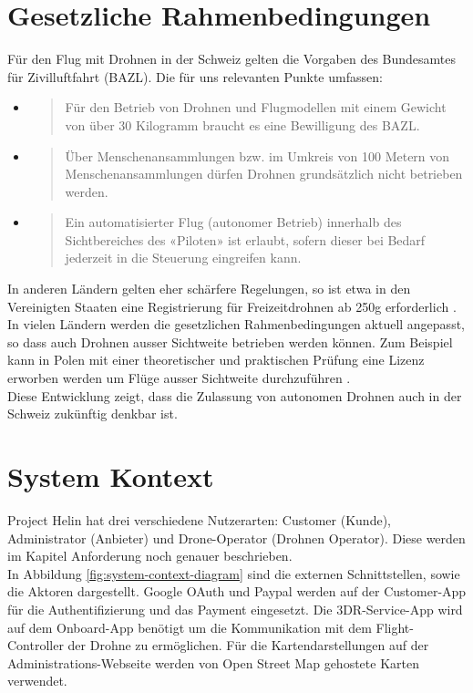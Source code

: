 \section{Gesetzliche Rahmenbedingungen}
Für den Flug mit Drohnen in der Schweiz gelten die Vorgaben des Bundesamtes für Zivilluftfahrt (BAZL). Die für uns relevanten Punkte umfassen:
\begin{itemize}
	\item{\blockquote{Für den Betrieb von Drohnen und Flugmodellen mit einem Gewicht von über 30 Kilogramm braucht es eine Bewilligung des BAZL.} \cite{drohne-bazl}}
	\item{\blockquote{Über Menschenansammlungen bzw. im Umkreis von 100 Metern von Menschenansammlungen dürfen Drohnen grundsätzlich nicht betrieben werden.} \cite{drohne-bazl}}
	\item{\blockquote{Ein automatisierter Flug (autonomer Betrieb) innerhalb des Sichtbereiches des «Piloten» ist erlaubt, sofern dieser bei Bedarf jederzeit in die Steuerung eingreifen kann.}
	\cite{drohne-bazl}}
\end{itemize}
In anderen Ländern gelten eher schärfere Regelungen, so ist etwa in den Vereinigten Staaten eine Registrierung für Freizeitdrohnen ab 250g erforderlich \cite[Seite 26]{pwc-drone}. In vielen Ländern werden die gesetzlichen Rahmenbedingungen aktuell angepasst, so dass auch Drohnen ausser Sichtweite betrieben werden können. Zum Beispiel kann in Polen mit einer theoretischer und praktischen Prüfung eine Lizenz erworben werden um Flüge ausser Sichtweite durchzuführen \cite[Seite 21]{pwc-drone}.\\

Diese Entwicklung zeigt, dass die Zulassung von autonomen Drohnen auch in der Schweiz zukünftig denkbar ist. 

\section{System Kontext}

Project Helin hat drei verschiedene Nutzerarten: Customer (Kunde), Administrator (Anbieter) und Drone-Operator (Drohnen Operator). Diese werden im Kapitel Anforderung noch genauer beschrieben.\\

In Abbildung \ref{fig:system-context-diagram} sind die externen Schnittstellen, sowie die Aktoren dargestellt. Google OAuth und Paypal werden auf der Customer-App für die Authentifizierung und das Payment eingesetzt. Die 3DR-Service-App wird auf dem Onboard-App benötigt um die Kommunikation mit dem Flight-Controller der Drohne zu ermöglichen. Für die Kartendarstellungen auf der Administrations-Webseite werden von Open Street Map gehostete Karten verwendet.


